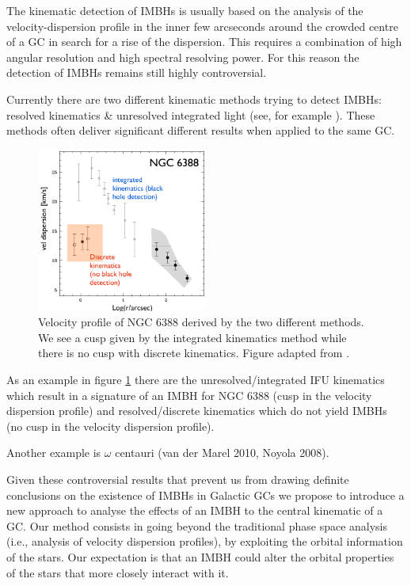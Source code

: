 \par The kinematic detection of \acp{IMBH} is usually based on the analysis of the velocity-dispersion profile in the inner few arcseconds around the crowded centre of a \ac{GC} in search for a rise of the dispersion. This requires a combination of high angular resolution and high spectral resolving power. For this reason the detection of \acp{IMBH} remains still highly controversial. 
\par Currently there are two different kinematic methods trying to detect \acp{IMBH}: resolved kinematics \& unresolved integrated light (see, for example \citealt{2015MNRAS.453..365B}). These methods often deliver significant different results when applied to the same \ac{GC}.
\begin{figure}[htbp]
\centering
\includegraphics[width=0.5\textwidth]{Plots/Paolo_talk_plot.png}
\caption{Velocity profile of NGC 6388 derived by the two different methods. We see a cusp given by the integrated kinematics method while there is no cusp with discrete kinematics. Figure adapted from \citet{2013ApJ...769..107L} .}
\label{fig:NGC6388}
\end{figure}
 As an example in figure \ref{fig:NGC6388} there are the unresolved/integrated IFU kinematics which result in a signature of an \ac{IMBH} for NGC 6388 (cusp in the velocity dispersion profile) \citep{2011A&A...533A..36L} and resolved/discrete kinematics which do not yield \acp{IMBH} (no cusp in the velocity dispersion profile)\citet{2013ApJ...769..107L}. 

Another example is \(\omega\) centauri (van der Marel 2010, Noyola 2008).

\par Given these controversial results that prevent us from drawing definite conclusions on the existence of \acp{IMBH} in Galactic \acp{GC} we propose to introduce a new approach to analyse the effects of an \ac{IMBH} to the central kinematic of a \ac{GC}. Our method consists in going beyond the traditional phase space analysis (i.e., analysis of velocity dispersion profiles), by exploiting the orbital information of the stars. Our expectation is that an \ac{IMBH} could alter the orbital properties of the stars that more closely interact with it.
\\

